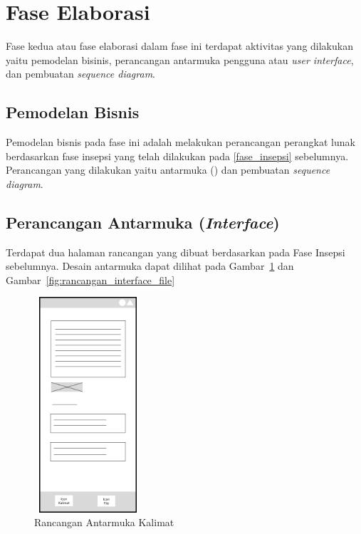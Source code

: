 \section{Fase Elaborasi}
Fase kedua atau fase elaborasi dalam fase ini terdapat aktivitas yang dilakukan yaitu pemodelan bisinis, perancangan antarmuka
pengguna atau \emph{user interface}, dan pembuatan \emph{sequence diagram}.

\subsection{Pemodelan Bisnis}
Pemodelan bisnis pada fase ini adalah melakukan perancangan perangkat lunak berdasarkan fase insepsi yang telah dilakukan
pada \autoref{fase_insepsi} sebelumnya. Perancangan yang dilakukan yaitu antarmuka () dan pembuatan
\emph{sequence diagram}.

\subsection{Perancangan Antarmuka (\emph{Interface})}
Terdapat dua halaman rancangan yang dibuat berdasarkan pada Fase Insepsi sebelumnya. Desain antarmuka
dapat dilihat pada Gambar~\ref{fig:rancangan_interface_kalimat} dan Gambar~\ref{fig:rancangan_interface_file}

\begin{figure}[H]
  \centering
  \includegraphics[width=4cm, height=8cm]{assets/rancangan_interface_kalimat.png}
  \caption{Rancangan Antarmuka Kalimat}
  \label{fig:rancangan_interface_kalimat}
\end{figure}

